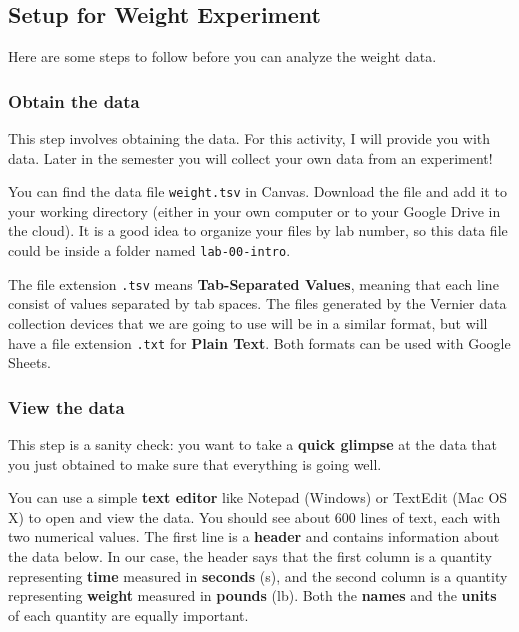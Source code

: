 \subsection{Setup for Weight Experiment}
Here are some steps to follow before you can analyze the weight data.
\subsubsection{Obtain the data}
This step involves obtaining the data. For this activity, I will provide you with data. Later in the semester you will collect your own data from an experiment!

You can find the data file \texttt{weight.tsv} in Canvas. Download the file and add it to your working directory (either in your own computer or to your Google Drive in the cloud). It is a good idea to organize your files by lab number, so this data file could be inside a folder named \texttt{lab-00-intro}.

The file extension \texttt{.tsv} means \textbf{Tab-Separated Values}, meaning that each line consist of values separated by tab spaces. The files generated by the Vernier data collection devices that we are going to use will be in a similar format, but will have a file extension \texttt{.txt} for \textbf{Plain Text}. Both formats can be used with Google Sheets.
\subsubsection{View the data}
This step is a sanity check: you want to take a \textbf{quick glimpse} at the data that you just obtained to make sure that everything is going well.

You can use a simple \textbf{text editor} like Notepad (Windows) or TextEdit (Mac OS X) to open and view the data. You should see about 600 lines of text, each with two numerical values. The first line is a \textbf{header} and contains information about the data below. In our case, the header says that the first column is a quantity representing \textbf{time} measured in \textbf{seconds} (s), and the second column is a quantity representing \textbf{weight} measured in \textbf{pounds} (lb). Both the \textbf{names} and the \textbf{units} of each quantity are equally important.

